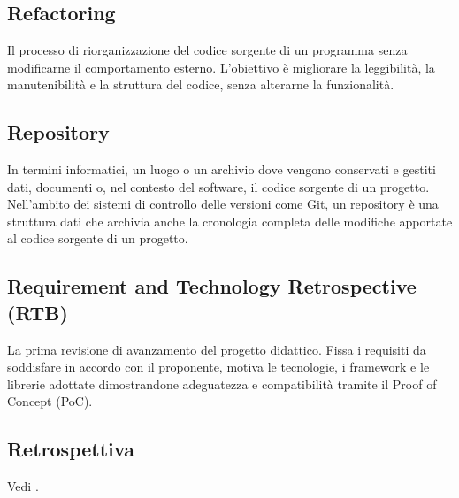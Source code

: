\newpage



\section{}

\hypertarget{sec:refactoring}{}
\subsection*{Refactoring}
Il processo di riorganizzazione del codice sorgente di un programma senza modificarne il comportamento esterno. L'obiettivo è 
migliorare la leggibilità, la manutenibilità e la struttura del codice, senza alterarne la funzionalità.

\subsection*{Repository}
In termini informatici, un luogo o un archivio dove vengono conservati e gestiti dati, documenti o, nel contesto del software, il codice sorgente di un 
progetto. Nell'ambito dei sistemi di controllo delle versioni come Git, un repository è una struttura dati che archivia anche la cronologia completa delle 
modifiche apportate al codice sorgente di un progetto.

\subsection*{Requirement and Technology Retrospective (RTB)}
La prima revisione di avanzamento del progetto didattico. Fissa i requisiti da soddisfare in accordo con il proponente, motiva le tecnologie, i framework 
e le librerie adottate dimostrandone adeguatezza e compatibilità tramite il Proof of Concept (PoC).

\subsection*{Retrospettiva}
Vedi .

\newpage